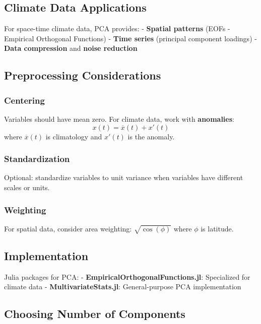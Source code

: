 \documentclass[
  letterpaper,
  DIV=11,
  numbers=noendperiod]{scrreprt}
\begin{document}
\subsection{Climate Data Applications}\label{climate-data-applications}

For space-time climate data, PCA provides: - \textbf{Spatial patterns}
(EOFs - Empirical Orthogonal Functions) - \textbf{Time series}
(principal component loadings) - \textbf{Data compression} and
\textbf{noise reduction}

\subsection{Preprocessing
Considerations}\label{preprocessing-considerations}

\subsubsection{Centering}\label{centering}

Variables should have mean zero. For climate data, work with
\textbf{anomalies}: \[
x(t) = \overline{x}(t) + x'(t)
\] where \(\overline{x}(t)\) is climatology and \(x'(t)\) is the
anomaly.

\subsubsection{Standardization}\label{standardization}

Optional: standardize variables to unit variance when variables have
different scales or units.

\subsubsection{Weighting}\label{weighting}

For spatial data, consider area weighting: \(\sqrt{\cos(\phi)}\) where
\(\phi\) is latitude.

\subsection{Implementation}\label{implementation}

Julia packages for PCA: - \textbf{EmpiricalOrthogonalFunctions.jl}:
Specialized for climate data - \textbf{MultivariateStats.jl}:
General-purpose PCA implementation

\subsection{Choosing Number of
Components}\label{choosing-number-of-components}
\end{document}
